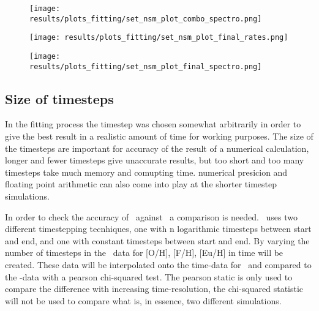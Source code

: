 \begin{figure}[h]
\begin{minipage}[h][][t]{0.49\textwidth}
{      \label{fig:fit-v3-combo-nsmr}
    }
  \end{minipage}
  \begin{minipage}[h][][t]{0.49\textwidth}
    \centering
    \texttt{[image: results/plots\_fitting/set\_nsm\_plot\_combo\_spectro.png]}
    \caption[\todo combo'spectro' plot]{
      \label{fig:fit-v3-combo-euro}
    }
  \end{minipage}
  \begin{minipage}[h][][t]{0.49\textwidth}
    \centering
    \texttt{[image: results/plots\_fitting/set\_nsm\_plot\_final\_rates.png]}
    \caption[\todo final rate plot]{
      \label{fig:fit-v3-nsmr}
    }
  \end{minipage}
  \begin{minipage}[h][][t]{0.49\textwidth}
    \centering
    \texttt{[image: results/plots\_fitting/set\_nsm\_plot\_final\_spectro.png]}
    \caption[\todo final spectro plot]{
      \label{fig:fit-v3-final-euro}
    }
  \end{minipage}
\end{figure}

\begin{table}[h]
  \caption[\omegamodel-parameters from fitting r-process events to \eris]{
    \label{tab:fitting-parameters-nsm}
  }
\end{table}
\FloatBarrier

\iffalse

\subsection{Size of timesteps}
In the fitting process the timestep was chosen somewhat arbitrarily in order to give the best result in a realistic amount of time for working purposes. The size of the timesteps are important for accuracy of the result of a numerical calculation, longer and fewer timesteps give unaccurate results, but too short and too many timesteps take much memory and comupting time. numerical presicion and floating point arithmetic can also come into play at the shorter timestep simulations.

In order to check the accuracy of \omegamodel\ against \eris\ a comparison is needed.
\omegamodel\ uses two different timestepping tecnhiques, one with n logarithmic timesteps between start and end, and one with constant timesteps between start and end.
By varying the number of timesteps in the \omegamodel\ data for [O/H], [F/H], [Eu/H] in time will be created.
These data will be interpolated onto the time-data for \eris\ and compared to the \eris-data with a pearson chi-squared test. The pearson static is only used to compare the difference with increasing time-resolution, the chi-squared statistic will not be used to compare what is, in essence, two different simulations.


